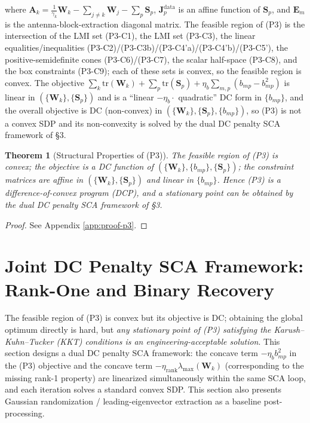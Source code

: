 \documentclass[12pt,a4paper]{article}
\newtheorem{theorem}{Theorem}
\newcommand{\mat}[1]{\mathbf{#1}}
\newcommand{\tr}{\text{tr}}
\begin{document}
where $\mat{A}_k = \frac{1}{\gamma_k} \mat{W}_k - \sum_{j \neq k} \mat{W}_j - \sum_{p} \mat{S}_p$, $\mat{J}_p^{\text{data}}$ is an affine function of $\mat{S}_p$, and $\mat{E}_m$ is the antenna-block-extraction diagonal matrix. The feasible region of (P3) is the intersection of the LMI set (P3-C1), the LMI set (P3-C3), the linear equalities/inequalities (P3-C2)/(P3-C3b)/(P3-C4'a)/(P3-C4'b)/(P3-C5'), the positive-semidefinite cones (P3-C6)/(P3-C7), the scalar half-space (P3-C8), and the box constraints (P3-C9); each of these sets is convex, so the feasible region is convex. The objective $\sum_k \tr(\mat{W}_k) + \sum_p \tr(\mat{S}_p) + \eta_b \sum_{m,p} (b_{mp} - b_{mp}^2)$ is linear in $(\{\mat{W}_k\}, \{\mat{S}_p\})$ and is a ``linear $-\eta_b \cdot$ quadratic'' DC form in $\{b_{mp}\}$, and the overall objective is DC (non-convex) in $(\{\mat{W}_k\}, \{\mat{S}_p\}, \{b_{mp}\})$, so (P3) is not a convex SDP and its non-convexity is solved by the dual DC penalty SCA framework of \S3.

\begin{theorem}[Structural Properties of (P3)]\label{thm:p3-structure}
The feasible region of (P3) is convex; the objective is a DC function of $(\{\mat{W}_k\}, \{b_{mp}\}, \{\mat{S}_p\})$; the constraint matrices are affine in $(\{\mat{W}_k\}, \{\mat{S}_p\})$ and linear in $\{b_{mp}\}$. Hence (P3) is a difference-of-convex program (DCP), and a stationary point can be obtained by the dual DC penalty SCA framework of \S3.
\end{theorem}

\begin{proof}
See Appendix \ref{app:proof-p3}.
\end{proof}

\section{Joint DC Penalty SCA Framework: Rank-One and Binary Recovery}\label{sec:sca}

The feasible region of (P3) is convex but its objective is DC; obtaining the global optimum directly is hard, but \emph{any stationary point of (P3) satisfying the Karush--Kuhn--Tucker (KKT) conditions is an engineering-acceptable solution}. This section designs a dual DC penalty SCA framework: the concave term $-\eta_b b_{mp}^2$ in the (P3) objective and the concave term $-\eta_{\text{rank}} \lambda_{\max}(\mat{W}_k)$ (corresponding to the missing rank-1 property) are linearized simultaneously within the same SCA loop, and each iteration solves a standard convex SDP. This section also presents Gaussian randomization / leading-eigenvector extraction as a baseline post-processing.
\end{document}
